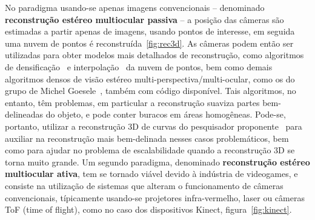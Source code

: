 No paradigma usando-se apenas imagens convencionais -- denominado
\textbf{reconstrução estéreo multiocular passiva} --  a posição das câmeras são
estimadas a partir apenas de imagens, usando pontos de interesse, em seguida uma
nuvem de pontos é reconstruída~\ref{fig:rec3d}.
As câmeras podem então ser utilizadas para obter modelos mais detalhados de reconstrução, como algoritmos de densificação~\cite{Furukawa:Ponce:CVPR2007} e interpolação~\cite{poisson} da nuvem de pontos, bem como demais algoritmos densos de visão estéreo multi-perspectiva/multi-ocular, como os do grupo de Michel Goesele~\cite{Goesele:MVE:2014}, também com código disponível. Tais algoritmos, no entanto, têm problemas, em particular a reconstrução suaviza partes bem-delineadas do objeto, e pode conter buracos em áreas homogêneas. Pode-se, portanto, utilizar a reconstrução 3D de curvas do pesquisador proponente~\cite{Usumezbas:Fabbri:Kimia:ECCV16,Fabbri:Kimia:IJCV2016,Fabbri:Kimia:CVPR10,Fabbri:Giblin:Kimia:ECCV12} para auxiliar na reconstrução mais bem-delinada nesses casos problemáticos, bem como para ajudar
no problema de escalabilidade quando a reconstrução 3D se torna muito grande.
Um segundo paradigma, denominado \textbf{reconstrução estéreo multiocular
ativa}, tem se tornado viável devido à indústria de videogames, e consiste na
utilização de sistemas que alteram o funcionamento de câmeras convencionais,
típicamente usando-se projetores infra-vermelho, laser ou câmeras ToF (time of
flight), como no caso dos dispositivos Kinect, figura~\ref{fig:kinect}.

